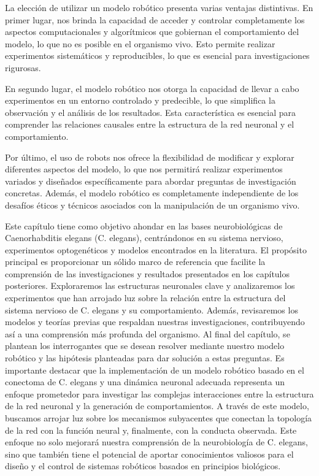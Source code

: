 La elección de utilizar un modelo robótico presenta varias ventajas distintivas. En primer lugar, nos brinda la capacidad de acceder y controlar completamente los aspectos computacionales y algorítmicos que gobiernan el comportamiento del modelo, lo que no es posible en el organismo vivo. Esto permite realizar experimentos sistemáticos y reproducibles, lo que es esencial para investigaciones rigurosas.

En segundo lugar, el modelo robótico nos otorga la capacidad de llevar a cabo experimentos en un entorno controlado y predecible, lo que simplifica la observación y el análisis de los resultados. Esta característica es esencial para comprender las relaciones causales entre la estructura de la red neuronal y el comportamiento. 

Por último, el uso de robots nos ofrece la flexibilidad de modificar y explorar diferentes aspectos del modelo, lo que nos permitirá realizar experimentos variados y diseñados específicamente para abordar preguntas de investigación concretas. Además, el modelo robótico es completamente independiente de los desafíos éticos y técnicos asociados con la manipulación de un organismo vivo.

Este capítulo tiene como objetivo ahondar en las bases neurobiológicas de Caenorhabditis elegans (C. elegans), centrándonos en su sistema nervioso, experimentos optogenéticos y modelos encontrados en la literatura. El propósito principal es proporcionar un sólido marco de referencia que facilite la comprensión de las investigaciones y resultados presentados en los capítulos posteriores. Exploraremos las estructuras neuronales clave y analizaremos los experimentos que han arrojado luz sobre la relación entre la estructura del sistema nervioso de C. elegans y su comportamiento. Además, revisaremos los modelos y teorías previas que respaldan nuestras investigaciones, contribuyendo así a una comprensión más profunda del organismo.   Al final del capítulo, se plantean los interrogantes que se desean resolver mediante nuestro modelo robótico y las hipótesis planteadas para dar solución a estas preguntas. Es importante destacar  que la implementación de un modelo robótico basado en el conectoma de C. elegans y una dinámica neuronal adecuada representa un enfoque prometedor para investigar las complejas interacciones entre la estructura de la red neuronal y la generación de comportamientos. A través de este modelo, buscamos arrojar luz sobre los mecanismos subyacentes que conectan la topología de la red con la función neural y, finalmente, con la conducta observada. Este enfoque no solo mejorará nuestra comprensión de la neurobiología de C. elegans, sino que también tiene el potencial de aportar conocimientos valiosos para el diseño y el control de sistemas robóticos basados en principios biológicos.



